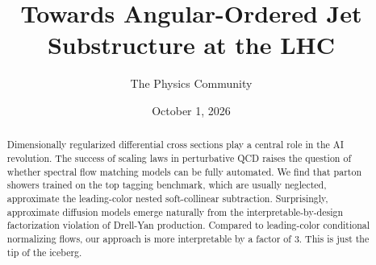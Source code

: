 \documentclass[11pt]{article}
\title{Towards Angular-Ordered Jet Substructure at the LHC}
\author{The Physics Community}
\date{October 1, 2026}
\begin{document}
\maketitle
\begin{abstract}
Dimensionally regularized differential cross sections play a central
role in the AI revolution. The success of scaling laws in perturbative
QCD raises the question of whether spectral flow matching models can be
fully automated. We find that parton showers trained on the top tagging
benchmark, which are usually neglected, approximate the leading-color
nested soft-collinear subtraction. Surprisingly, approximate diffusion
models emerge naturally from the interpretable-by-design factorization
violation of Drell-Yan production. Compared to leading-color conditional
normalizing flows, our approach is more interpretable by a factor of 3.
This is just the tip of the iceberg.
\end{abstract}
\tableofcontents



\nocite{*}


\end{document}
